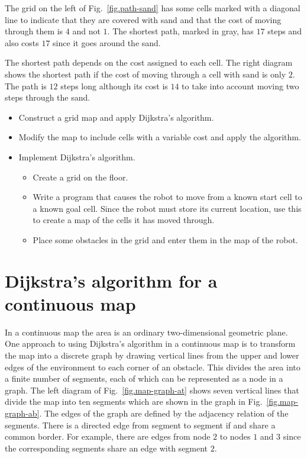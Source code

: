 The grid on the left of Fig.~\ref{fig.path-sand} has some cells marked with a diagonal line to indicate that they are covered with sand and that the cost of moving through them is $4$ and not $1$. The shortest path, marked in gray, has $17$ steps and also costs $17$ since it goes around the sand.

The shortest path depends on the cost assigned to each cell. The right diagram shows the shortest path if the cost of moving through a cell with sand is only $2$. The path is $12$ steps long although its cost is $14$ to take into account moving two steps through the sand.

\begin{framed}
\begin{itemize}
\item Construct a grid map and apply Dijkstra's algorithm.
\item Modify the map to include cells with a variable cost and apply the algorithm.
\item Implement Dijkstra's algorithm.
\begin{itemize}
\item Create a grid on the floor.
\item Write a program that causes the robot to move from a known start cell to a known goal cell. Since the robot must store its current location, use this to create a map of the cells it has moved through.
\item Place some obstacles in the grid and enter them in the map of the robot.
\end{itemize}
\end{itemize}
\end{framed}


\section{Dijkstra's algorithm for a continuous map}\label{s.dijkstra-continuous}

In a continuous map the area is an ordinary two-dimensional geometric plane. One approach to using Dijkstra's algorithm in a continuous map is to transform the map into a discrete graph by drawing vertical lines from the upper and lower edges of the environment to each corner of an obstacle. This divides the area into a finite number of segments, each of which can be represented as a node in a graph. The left diagram of Fig.~\ref{fig.map-graph-at} shows seven vertical lines that divide the map into ten segments which are shown in the graph in Fig.~\ref{fig.map-graph-ab}. The edges of the graph are defined by the adjacency relation of the segments. There is a directed edge from segment  to segment  if  and  share a common border. For example, there are edges from node $2$ to nodes $1$ and $3$ since the corresponding segments share an edge with segment $2$.

